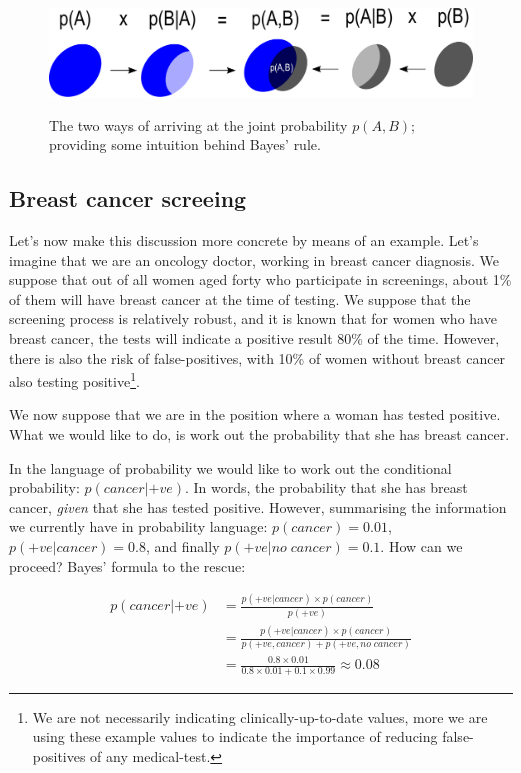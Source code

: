 \documentclass[11pt,fullpage]{book}
\begin{document}
\begin{figure}
\centering
\scalebox{0.4} 
{\includegraphics{Probability_BayesianIntuition.pdf}}
\caption{The two ways of arriving at the joint probability $p(A,B)$; providing some intuition behind Bayes' rule.}\label{fig:Probability_BayesianIntuition}
\end{figure}

\subsection{Breast cancer screeing}
Let's now make this discussion more concrete by means of an example. Let's imagine that we are an oncology doctor, working in breast cancer diagnosis. We suppose that out of all women aged forty who participate in screenings, about 1\% of them will have breast cancer at the time of testing. We suppose that the screening process is relatively robust, and it is known that for women who have breast cancer, the tests will indicate a positive result 80\% of the time. However, there is also the risk of false-positives, with 10\% of women without breast cancer also testing positive\footnote{We are not necessarily indicating clinically-up-to-date values, more we are using these example values to indicate the importance of reducing false-positives of any medical-test.}.

We now suppose that we are in the position where a woman has tested positive. What we would like to do, is work out the probability that she has breast cancer.

In the language of probability we would like to work out the conditional probability: $p(cancer|+ve)$. In words, the probability that she has breast cancer, \textit{given} that she has tested positive. However, summarising the information we currently have in probability language: $p(cancer)=0.01$, $p(+ve|cancer)=0.8$, and finally $p(+ve|no\; cancer) = 0.1$. How can we proceed? Bayes' formula to the rescue:

\begin{equation}\label{eq:Probability_bayesBreastCancer}
\begin{align}
p(cancer|+ve) &= \frac{p(+ve|cancer)\times p(cancer)}{p(+ve)}\\
&= \frac{p(+ve|cancer)\times p(cancer)}{p(+ve,cancer)+p(+ve,no\;cancer)}\\
&= \frac{0.8\times 0.01}{0.8\times 0.01 + 0.1\times 0.99} \approx 0.08
\end{align}
\end{equation}
\end{document}
